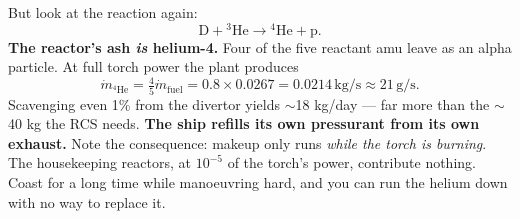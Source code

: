 \documentclass[11pt]{article}
\newcommand{\he}{\ensuremath{{}^3\mathrm{He}}}
\newcommand{\unit}[1]{\,\mathrm{#1}}
\begin{document}
But look at the reaction again:
\begin{equation}
\mathrm{D}+\he \longrightarrow \boxed{{}^4\mathrm{He}} + \mathrm{p}.
\end{equation}
\textbf{The reactor's ash \emph{is} helium-4.} Four of the five reactant amu leave as an alpha particle. At full torch power the plant produces
\begin{equation}
\dot m_{{}^4\mathrm{He}} = \tfrac45 \dot m_{\text{fuel}} = 0.8\times 0.0267 = 0.0214\unit{kg/s}\approx 21\unit{g/s}.
\end{equation}
Scavenging even 1\% from the divertor yields $\sim$18 kg/day --- far more than the $\sim$40 kg the RCS needs. \textbf{The ship refills its own pressurant from its own exhaust.} Note the consequence: makeup only runs \emph{while the torch is burning}. The housekeeping reactors, at $10^{-5}$ of the torch's power, contribute nothing. Coast for a long time while manoeuvring hard, and you can run the helium down with no way to replace it.
\end{document}
